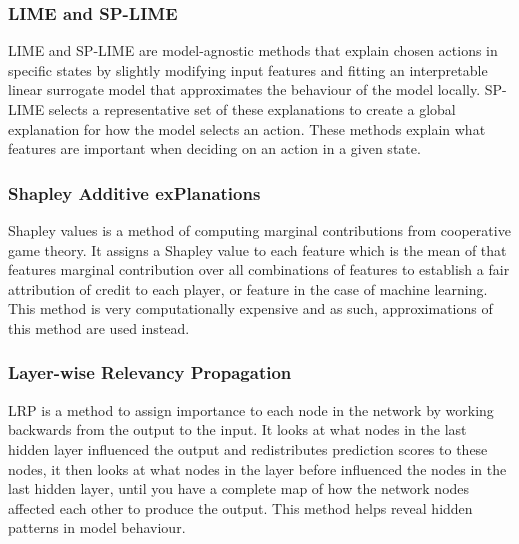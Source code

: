 \documentclass[UKenglish]{uiomasterthesis}
\begin{document}
\subsubsection{LIME and SP-LIME}
LIME and SP-LIME are model-agnostic methods that explain chosen actions in specific states by slightly modifying input features and fitting an interpretable linear surrogate model that approximates the behaviour of the model locally. SP-LIME selects a representative set of these explanations to create a global explanation for how the model selects an action. These methods explain what features are important when deciding on an action in a given state.

\subsubsection{Shapley Additive exPlanations}
Shapley values is a method of computing marginal contributions from cooperative game theory. It assigns a Shapley value to each feature which is the mean of that features marginal contribution over all combinations of features to establish a fair attribution of credit to each player, or feature in the case of machine learning. This method is very computationally expensive and as such, approximations of this method are used instead.

\subsubsection{Layer-wise Relevancy Propagation}
LRP is a method to assign importance to each node in the network by working backwards from the output to the input. It looks at what nodes in the last hidden layer influenced the output and redistributes prediction scores to these nodes, it then looks at what nodes in the layer before influenced the nodes in the last hidden layer, until you have a complete map of how the network nodes affected each other to produce the output. This method helps reveal hidden patterns in model behaviour.

\subsubsection{}
\end{document}
